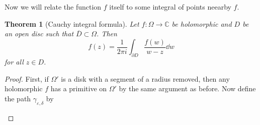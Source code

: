 \documentclass[leqno, openany]{memoir}
\newtheorem{thm}{Theorem}[section]
\theoremstyle{definition}
\theoremstyle{remark}
\theoremstyle{plain}
\theoremstyle{definition}
\theoremstyle{remark}
\newcommand{\C}{\mathbb{C}}
\newcommand{\ep}{\varepsilon}
\newcommand{\ol}[1]{\overline{#1}}
\begin{document}
Now we will relate the function $f$ itself to some integral of points neearby
$f$.

\begin{thm}[Cauchy integral formula] Let $f \colon \Omega \to \C$ be
    holomorphic and $D$ be an open disc such that $\ol{D} \subset \Omega$. Then
    \[ f(z) = \frac{1}{2 \pi i} \int_{\partial D} \frac{f(w)}{w-z} \dd{w} \]
for all $z \in D$.  \end{thm}

\begin{proof} First, if $\Omega'$ is a disk with a segment of a radius removed,
    then any holomorphic $f$ has a primitive on $\Omega'$ by the same argument
    as before. Now define the path $\gamma_{\ep, \delta}$ by \begin{figure}[H]
        \begin{center} 
\end{center}
\end{figure}
\end{proof}
\end{document}
